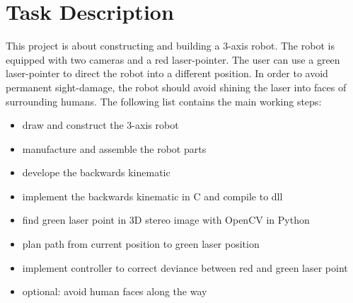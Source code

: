 \documentclass[./\jobname.tex]{subfiles}
\begin{document}
\chapter{Task Description}

This project is about constructing and building a 3-axis robot. The robot is equipped with two cameras and a red laser-pointer. The user can use a green laser-pointer to direct the robot into a different position. In order to avoid permanent sight-damage, the robot should avoid shining the laser into faces of surrounding humans. The following list contains the main working steps:

\begin{itemize}
	\item draw and construct the 3-axis robot 
	\item manufacture and assemble the robot parts 
	\item develope the backwards kinematic 
	\item implement the backwards kinematic in C and compile to dll 
	\item find green laser point in 3D stereo image with OpenCV in Python 
	\item plan path from current position to green laser position 
	\item implement controller to correct deviance between red and green laser point 
	\item optional: avoid human faces along the way
\end{itemize}
\end{document}
